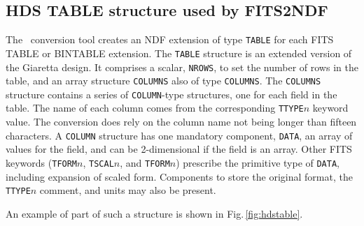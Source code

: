 \documentclass[final,authoryear,5p,times,twocolumn]{elsarticle}
\begin{document}
\subsection{HDS TABLE structure used by FITS2NDF}
\label{app:hdstable}

The \fitstondf\ conversion tool \citep{SUN55} creates an NDF extension
of type \texttt{TABLE} for each FITS TABLE or BINTABLE extension. The
\texttt{TABLE} structure is an extended version of the Giaretta
design.  It comprises a scalar, \texttt{NROWS}, to set the number of
rows in the table, and an array structure \texttt{COLUMNS} also of
type \texttt{COLUMNS}.  The \texttt{COLUMNS} structure contains a
series of \texttt{COLUMN}-type structures, one for each field in the
table. The name of each column comes from the corresponding
\texttt{TTYPE$n$} keyword value.  The conversion does rely on the
column name not being longer than fifteen characters.  A
\texttt{COLUMN} structure has one mandatory component, \texttt{DATA},
an array of values for the field, and can be 2-dimensional if the
field is an array.  Other FITS keywords (\texttt{TFORM$n$},
\texttt{TSCAL$n$}, and \texttt{TFORM$n$}) prescribe the primitive type
of \texttt{DATA}, including expansion of scaled form.  Components to
store the original format, the \texttt{TTYPE$n$} comment, and units
may also be present.

An example of part of such a structure is shown in
Fig.\,\ref{fig:hdstable}.
\end{document}
